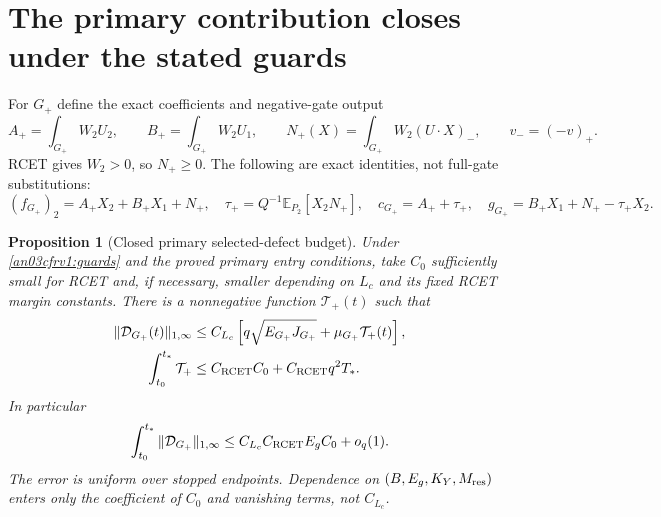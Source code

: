 \documentclass[11pt]{article}
\newtheorem{proposition}{Proposition}[section]
\theoremstyle{remark}\newtheorem{remark}[proposition]{Remark}
\newcommand{\E}{\mathbb E}
\newcommand{\Gp}{G_+}
\begin{document}
\section{The primary contribution closes under the stated guards}
For $\Gp$ define the exact coefficients and negative-gate output
\[
 A_+=\int_{\Gp}W_2U_2,\qquad B_+=\int_{\Gp}W_2U_1,\qquad
 N_+(X)=\int_{\Gp}W_2(U\cdot X)_-,
 \qquad v_-=(-v)_+ .
\]
RCET gives $W_2>0$, so $N_+\ge0$.
The following are exact identities, not full-gate substitutions:
\begin{equation}
 (f_{\Gp})_2=A_+X_2+B_+X_1+N_+,\quad
 \tau_+=Q^{-1}\E_{P_2}[X_2N_+],\quad c_{\Gp}=A_++\tau_+,
 \quad g_{\Gp}=B_+X_1+N_+-\tau_+X_2 .
 \label{an03cfrv1:linearity}
\end{equation}

\begin{proposition}[Closed primary selected-defect budget]
\label{an03cfrv1:primary}
Under \eqref{an03cfrv1:guards} and the proved primary entry
conditions, take $C_0$ sufficiently small for RCET and,
if necessary, smaller depending on $L_c$ and its fixed
RCET margin constants. There is a nonnegative function
$\mathcal T_+(t)$ such that
\begin{align}
 \|\mathcal D_{\Gp}(t)\|_{1,\infty}
 &\le C_{L_c}\left[q\sqrt{E_{\Gp}J_{\Gp}}
                     +\mu_{\Gp}\mathcal T_+(t)\right],
 \label{an03cfrv1:primarypoint}\\
 \int_{t_0}^{t_*}\mathcal T_+
 &\le C_{\rm RCET}C_0+C_{\rm RCET}q^2T_* .
 \label{an03cfrv1:tailintegral}
\end{align}
In particular
\begin{equation}
 \int_{t_0}^{t_*}\|\mathcal D_{\Gp}\|_{1,\infty}
 \le C_{L_c}C_{\rm RCET}E_g C_0+o_q(1).
 \label{an03cfrv1:primaryintegral}
\end{equation}
The error is uniform over stopped endpoints. Dependence on
$(B,E_g,K_Y,M_{\rm res})$ enters only the coefficient of
$C_0$ and vanishing terms, not $C_{L_c}$.
\end{proposition}
\end{document}
